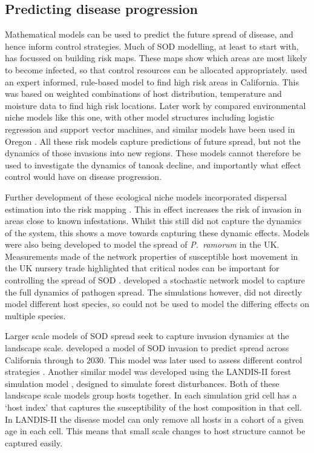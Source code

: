 \subsection{Predicting disease progression}

Mathematical models can be used to predict the future spread of disease, and hence inform control strategies. Much of SOD modelling, at least to start with, has focussed on building risk maps. These maps show which areas are most likely to become infected, so that control resources can be allocated appropriately. \citet{meentemeyer_mapping_2004} used an expert informed, rule-based model to find high risk areas in California. This was based on weighted combinations of host distribution, temperature and moisture data to find high risk locations. Later work by \citet{kelly_modeling_2007} compared environmental niche models like this one, with other model structures including logistic regression and support vector machines, and similar models have been used in Oregon \citep{vaclavik_mapping_2010}. All these risk models capture predictions of future spread, but not the dynamics of those invasions into new regions. These models cannot therefore be used to investigate the dynamics of tanoak decline, and importantly what effect control would have on disease progression.

Further development of these ecological niche models incorporated dispersal estimation into the risk mapping \citep{meentemeyer_early_2008}. This in effect increases the risk of invasion in areas close to known infestations. Whilst this still did not capture the dynamics of the system, this shows a move towards capturing these dynamic effects. Models were also being developed to model the spread of \emph{P.~ramorum} in the UK\@. Measurements made of the network properties of susceptible host movement in the UK nursery trade highlighted that critical nodes can be important for controlling the spread of SOD \citep{pautasso_epidemiological_2008, jeger_modelling_2007}. \citet{harwood_epidemiological_2009} developed a stochastic network model to capture the full dynamics of pathogen spread. The simulations however, did not directly model different host species, so could not be used to model the differing effects on multiple species.

Larger scale models of SOD spread seek to capture invasion dynamics at the landscape scale. \citet{meentemeyer_epidemiological_2011} developed a model of SOD invasion to predict spread across California through to 2030. This model was later used to assess different control strategies \citep{cunniffe_modelling_2016}. Another similar model \citep{tonini_modeling_2018} was developed using the LANDIS-II forest simulation model \citep{scheller_design_2007}, designed to simulate forest disturbances. Both of these landscape scale models group hosts together. In \citet{meentemeyer_early_2008} each simulation grid cell has a `host index' that captures the susceptibility of the host composition in that cell. In LANDIS-II the disease model can only remove all hosts in a cohort of a given age in each cell. This means that small scale changes to host structure cannot be captured easily.

